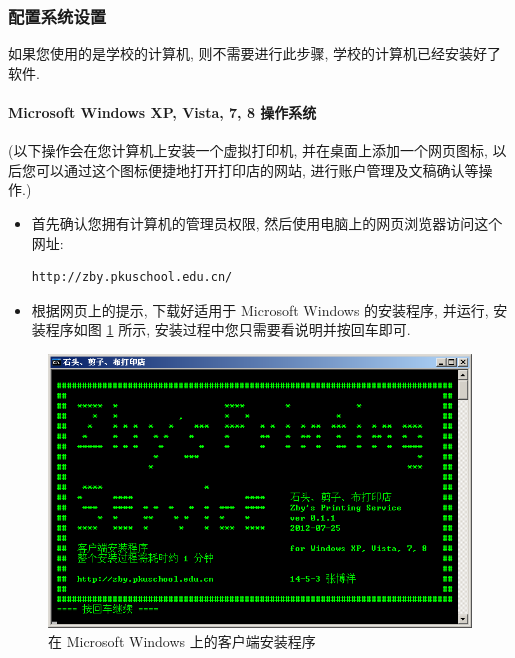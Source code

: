 \documentclass{article}
\begin{document}
\begin{CJK}{UTF8}{gbsn}
		\subsubsection{配置系统设置}
			如果您使用的是学校的计算机, 则不需要进行此步骤, 学校的计算机已经安装好了软件.
			\paragraph{Microsoft Windows XP, Vista, 7, 8 操作系统}
				(以下操作会在您计算机上安装一个虚拟打印机, 并在桌面上添加一个网页图标, 以后您可以通过这个图标便捷地打开打印店的网站, 进行账户管理及文稿确认等操作.)
				\begin{itemize}
					\item{首先确认您拥有计算机的管理员权限, 然后使用电脑上的网页浏览器访问这个网址: \begin{verbatim}http://zby.pkuschool.edu.cn/\end{verbatim}}
					\item{根据网页上的提示, 下载好适用于 Microsoft Windows 的安装程序, 并运行, 安装程序如图 \ref{fig:installer_win} 所示, 安装过程中您只需要看说明并按回车即可.}
				\end{itemize}
				
				\begin{figure}[hp]
					\centering
					\includegraphics[height=0.45\textheight]{installer_win.png}
					\caption{在 Microsoft Windows 上的客户端安装程序}
					\label{fig:installer_win}
				\end{figure}
				\clearpage

\end{CJK}
\end{document}
